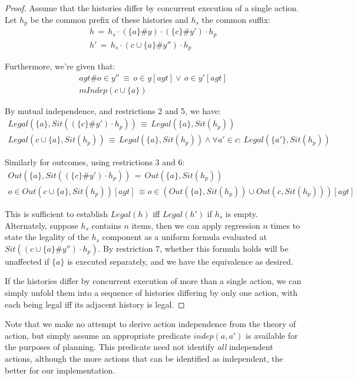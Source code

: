 \begin{proof}
Assume that the histories differ by concurrent execution of a single
action. Let $h_{p}$ be the common prefix of these histories and $h_{s}$
the common suffix:\begin{gather*}
h\,=\, h_{s}\cdot(\{a\}\#y)\cdot(\{c\}\#y')\cdot h_{p}\\
h'\,=\, h_{s}\cdot(c\cup\{a\}\#y'')\cdot h_{p}\end{gather*}


Furthermore, we're given that:\begin{gather*}
agt\#o\in y''\,\equiv\, o\in y[agt]\vee\, o\in y'[agt]\\
mIndep(c\cup\{a\})\end{gather*}


By mutual independence, and restrictions 2 and 5, we have: \begin{gather*}
Legal(\{a\},Sit((\{c\}\#y')\cdot h_{p}))\,\equiv\, Legal(\{a\},Sit(h_{p}))\\
Legal(c\cup\{a\},Sit(h_{p}))\,\equiv\, Legal(\{a\},Sit(h_{p}))\wedge\forall a'\in c:\, Legal(\{a'\},Sit(h_{p}))\end{gather*}


Similarly for outcomes, using restrictions 3 and 6:\begin{gather*}
Out(\{a\},Sit((\{c\}\#y')\cdot h_{p}))\,=\, Out(\{a\},Sit(h_{p}))\\
o\in Out(c\cup\{a\},Sit(h_{p}))[agt]\,\equiv o\in\left(Out(\{a\},Sit(h_{p}))\cup Out(c,Sit(h_{p}))\right)[agt]\end{gather*}


This is sufficient to establish $Legal(h)$ iff $Legal(h')$ if $h_{s}$
is empty. Alternately, suppose $h_{s}$ contains $n$ items, then
we can apply regression $n$ times to state the legality of the $h_{s}$
component as a uniform formula evaluated at $Sit((c\cup\{a\}\#y'')\cdot h_{p})$.
By restriction 7, whether this formula holds will be unaffected if
$\{a\}$ is executed separately, and we have the equivalence as desired.

If the histories differ by concurrent execution of more than a single
action, we can simply unfold them into a sequence of histories differing
by only one action, with each being legal iff its adjacent history
is legal. 
\end{proof}
Note that we make no attempt to derive action independence from the
theory of action, but simply assume an appropriate predicate $indep(a,a')$
is available for the purposes of planning. This predicate need not
identify \emph{all} independent actions, although the more actions
that can be identified as independent, the better for our implementation.


